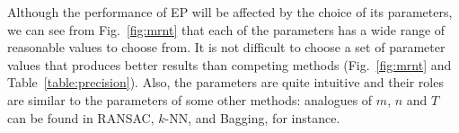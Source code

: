 Although the performance of EP will be affected by the choice of its
parameters, we can see from Fig.~\ref{fig:mrnt} that each of the
parameters has a wide range of reasonable values to choose from. It is
not difficult to choose a set of parameter values that produces better
results than competing methods (\cf Fig.~\ref{fig:mrnt} and
Table~\ref{table:precision}).  Also, the parameters are quite
intuitive and their roles are similar to the parameters of some
other methods: analogues of $m$, $n$ and $T$ can be found in
RANSAC, $k$-NN, and Bagging, for instance.



